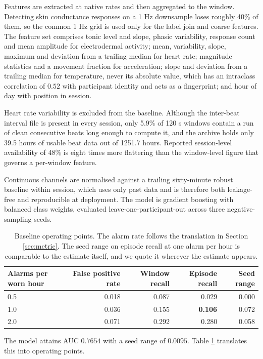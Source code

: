 \documentclass{article}
\begin{document}
Features are extracted at native rates and then aggregated to the window.
Detecting skin conductance responses on a 1 Hz downsample loses
roughly 40\% of them, so the common 1 Hz grid is used
only for the label join and coarse features. The feature set comprises tonic
level and slope, phasic variability, response count and mean amplitude for
electrodermal activity; mean, variability, slope, maximum and deviation from a
trailing median for heart rate; magnitude statistics and a movement fraction
for acceleration; slope and deviation from a trailing median for temperature,
never its absolute value, which has an intraclass correlation of $0.52$ with
participant identity and acts as a fingerprint; and hour of day with position
in session.

Heart rate variability is excluded from the baseline. Although the inter-beat
interval file is present in every session, only 5.9\% of
120 s windows contain a run of clean consecutive beats long enough
to compute it, and the archive holds only 39.5 hours of usable beat data
out of 1251.7 hours. Reported session-level availability of
48\% is eight times more flattering than the window-level figure
that governs a per-window feature.

Continuous channels are normalised against a trailing sixty-minute robust
baseline within session, which uses only past data and is therefore both
leakage-free and reproducible at deployment. The model is gradient boosting
with balanced class weights, evaluated leave-one-participant-out across three
negative-sampling seeds.

\begin{table}[t]
\caption{Baseline operating points. The alarm rate follows the translation in
Section \ref{sec:metric}. The seed range on episode recall at one alarm per
hour is comparable to the estimate itself, and we quote it wherever the
estimate appears.}
\label{tab:baseline}
\centering
\begin{tabular}{lrrrr}
\toprule
Alarms per worn hour & False positive rate & Window recall &
Episode recall & Seed range \\
\midrule
0.5 & 0.018 & 0.087 & 0.029 & 0.000 \\
1.0 & 0.036 & 0.155 & \textbf{0.106} & 0.072 \\
2.0 & 0.071 & 0.292 & 0.280 & 0.058 \\
\bottomrule
\end{tabular}
\end{table}

The model attains AUC $0.7654$ with a seed range of $0.0095$. Table
\ref{tab:baseline} translates this into operating points.
\end{document}
